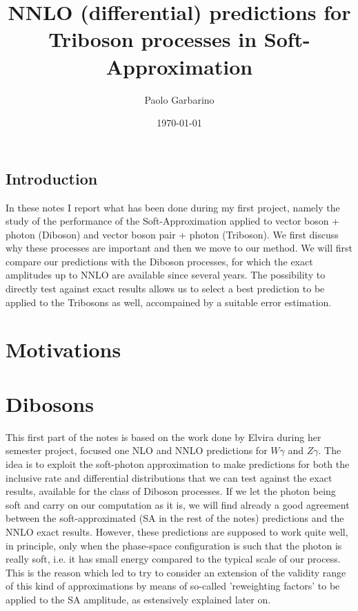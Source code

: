 \documentclass{report}
\title{NNLO (differential) predictions for Triboson processes in Soft-Approximation}
\author{Paolo Garbarino}
\date{\today}
\begin{document}
\maketitle

\section*{Introduction}
In these notes I report what has been done during my first project, namely the study of the performance of the Soft-Approximation applied to vector boson + photon (Diboson) and vector boson pair + photon (Triboson).
We first discuss why these processes are important and then we move to our method. We will first compare our predictions with the Diboson processes, for which the exact amplitudes up to NNLO are available since several years.
The possibility to directly test against exact results allows us to select a best prediction to be applied to the Tribosons as well, accompained by a suitable error estimation.

\chapter{Motivations}

\chapter{Dibosons}
This first part of the notes is based on the work done by Elvira during her semester project, focused one NLO and NNLO predictions for $W\gamma$ and $Z\gamma$. The idea is to exploit the soft-photon approximation to make predictions for both the inclusive rate and differential distributions that we can test against the exact results, available for the class of Diboson processes.
If we let the photon being soft and carry on our computation as it is, we will find already a good agreement between the soft-approximated (SA in the rest of the notes) predictions and the NNLO exact results. However, these predictions are supposed to work quite well, in principle, only when the phase-space configuration is such that the photon is really soft, i.e. it has small
energy compared to the typical scale of our process. This is the reason which led to try to consider an extension of the validity range of this kind of approximations by means of so-called 'reweighting factors' to be applied to the SA amplitude, as estensively explained later on.
\end{document}
